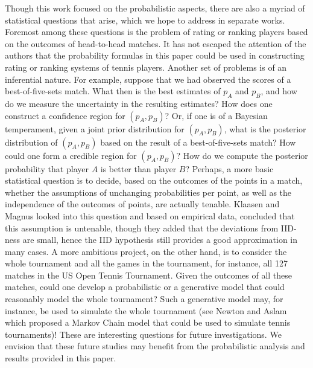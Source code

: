 \documentclass[11pt]{article}
\theoremstyle{plain}
\theoremstyle{definition}
\begin{document}
Though this work focused on the probabilistic aspects, there are also a myriad of statistical questions that arise, which we hope to address in separate works. Foremost among these questions is the problem of rating or ranking players based on the outcomes of head-to-head matches. It has not escaped the attention of the authors that the probability formulas in this paper could be used in constructing rating or ranking systems of tennis players. Another set of problems is of an inferential nature. For example, suppose that we had observed the scores of a best-of-five-sets match. What then is the best estimates of $p_A$ and $p_B$, and how do we measure the uncertainty in the resulting estimates? How does one construct a confidence region for $(p_A,p_B)$? Or, if one is of a Bayesian temperament, given a joint prior distribution for $(p_A,p_B)$, what is the posterior distribution of $(p_A,p_B)$ based on the result of a best-of-five-sets match? How could one form a credible region for $(p_A,p_B)$? How do we compute the posterior probability that player $A$ is better than player $B$? Perhaps, a more basic statistical question is to decide, based on the outcomes of the points in a match, whether the assumptions of unchanging probabilities per point, as well as the independence of the outcomes of points, are actually tenable. Klaasen and Magnus \cite{Klaasen_Magnus_2001} looked into this question and based on empirical data, concluded that this assumption is untenable, though they added that the deviations from {IID}-ness are small, hence the IID hypothesis still provides a good approximation in many cases. A more ambitious project, on the other hand, is to consider the whole tournament and all the games in the tournament, for instance, all 127 matches in the US Open Tennis Tournament. Given the outcomes of all these matches, could one develop a probabilistic or a generative model that could reasonably model the whole tournament? Such a generative model may, for instance, be used to simulate the whole tournament (see Newton and Aslam \cite{NewtonAslam2009} which proposed a Markov Chain model that could be used to simulate tennis tournaments)! These are interesting questions for future investigations. We envision that these future studies may benefit from the probabilistic analysis and results provided in this  paper.
\end{document}
